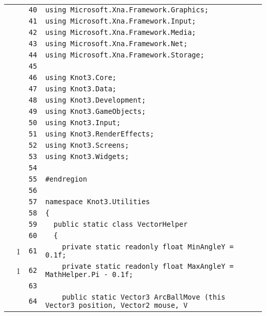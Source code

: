 \documentclass[a4paper,10pt]{article}
\begin{document}
\begin{longtable}[l]{lrrl}
\cellcolor{gray} &  & \verb~40~ & \verb~using Microsoft.Xna.Framework.Graphics;~\\
\cellcolor{gray} &  & \verb~41~ & \verb~using Microsoft.Xna.Framework.Input;~\\
\cellcolor{gray} &  & \verb~42~ & \verb~using Microsoft.Xna.Framework.Media;~\\
\cellcolor{gray} &  & \verb~43~ & \verb~using Microsoft.Xna.Framework.Net;~\\
\cellcolor{gray} &  & \verb~44~ & \verb~using Microsoft.Xna.Framework.Storage;~\\
\cellcolor{gray} &  & \verb~45~ & \verb~~\\
\cellcolor{gray} &  & \verb~46~ & \verb~using Knot3.Core;~\\
\cellcolor{gray} &  & \verb~47~ & \verb~using Knot3.Data;~\\
\cellcolor{gray} &  & \verb~48~ & \verb~using Knot3.Development;~\\
\cellcolor{gray} &  & \verb~49~ & \verb~using Knot3.GameObjects;~\\
\cellcolor{gray} &  & \verb~50~ & \verb~using Knot3.Input;~\\
\cellcolor{gray} &  & \verb~51~ & \verb~using Knot3.RenderEffects;~\\
\cellcolor{gray} &  & \verb~52~ & \verb~using Knot3.Screens;~\\
\cellcolor{gray} &  & \verb~53~ & \verb~using Knot3.Widgets;~\\
\cellcolor{gray} &  & \verb~54~ & \verb~~\\
\cellcolor{gray} &  & \verb~55~ & \verb~#endregion~\\
\cellcolor{gray} &  & \verb~56~ & \verb~~\\
\cellcolor{gray} &  & \verb~57~ & \verb~namespace Knot3.Utilities~\\
\cellcolor{gray} &  & \verb~58~ & \verb~{~\\
\cellcolor{gray} &  & \verb~59~ & \verb~  public static class VectorHelper~\\
\cellcolor{gray} &  & \verb~60~ & \verb~  {~\\
\cellcolor{green} & 1 & \verb~61~ & \verb~    private static readonly float MinAngleY = 0.1f;~\\
\cellcolor{green} & 1 & \verb~62~ & \verb~    private static readonly float MaxAngleY = MathHelper.Pi - 0.1f;~\\
\cellcolor{gray} &  & \verb~63~ & \verb~~\\
\cellcolor{gray} &  & \verb~64~ & \verb~    public static Vector3 ArcBallMove (this Vector3 position, Vector2 mouse, V~\\

\end{longtable}
\end{document}

